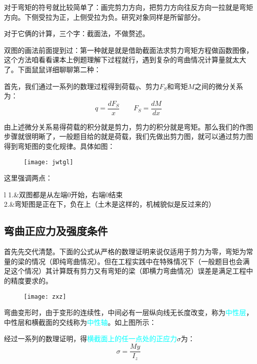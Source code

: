 \documentclass[10pt,a4paper]{ctexart}
\begin{document}
对于弯矩的符号就比较简单了：画完剪力方向，把剪力方向往反方向一拉就是弯矩方向。下侧受拉为正，上侧受拉为负。研究对象同样是所留部分。

对于它俩的计算，三个字：截面法，不做赘述。

双图的画法前面提到过：第一种就是就是借助截面法求剪力弯矩方程做函数图像，这个方法咱看看课本上例题理解下过程就行，遇到复杂的弯曲情况计算量就太大了。下面鼠鼠详细聊聊第二种：

首先，我们通过一系列的数理过程得到荷载$q$、剪力$F_S$和弯矩$M$之间的微分关系为：
\begin{equation}
	q=\frac{dF_S}{x} \qquad F_S=\frac{dM}{dx}
\end{equation}

由上述微分关系易得荷载的积分就是剪力，剪力的积分就是弯矩。那么我们的作图步骤就很明晰了，一般题目给的就是荷载，我们先做出剪力图，就可以通过剪力图得到弯矩图的变化规律。具体如图：
\begin{figure}[htp]%
	\centering
	\texttt{[image: jwtgl]}
\end{figure}

这里强调两点：

\begin{tblr}{l}
	1.&双图都是从左端0开始，右端0结束\\
	2.&弯矩图是正在下，负在上（土木是这样的，机械貌似是反过来的）
\end{tblr}

\subsection{弯曲正应力及强度条件}
首先先交代清楚。下面的公式从严格的数理证明来说仅适用于剪力为零，弯矩为常量的梁的情况（即纯弯曲情况）。但在工程实践中在特殊情况下（一般题目也会满足这个情况）其计算既有剪力又有弯矩的梁（即横力弯曲情况）误差是满足工程中的精度要求的。

\begin{figure}[htp]%
	\centering
	\texttt{[image: zxz]}
\end{figure}

弯曲变形时，由于变形的连续性，中间必有一层纵向线无长度改变，称为\textcolor{cyan}{中性层}，中性层和横截面的交线称为\textcolor{cyan}{中性轴}。如上图所示：

经过一系列的数理证明，得\textcolor{cyan}{横截面上的任一点处的正应力}$\sigma$为：
\begin{equation}
	\sigma=\frac{My}{I_z}
\end{equation}
\end{document}
